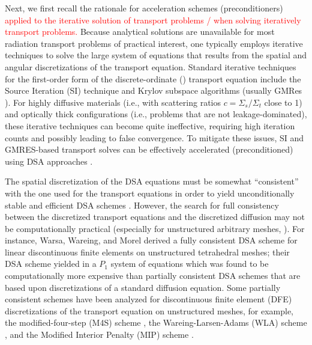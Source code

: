 
Next, we first recall the rationale for acceleration schemes (preconditioners) 
\textcolor{red}{applied to the iterative solution of
transport problems / when solving iteratively transport problems.}
Because analytical solutions are unavailable for most
radiation transport problems of practical interest, one typically employs
iterative techniques to solve the large system of equations that results from
the spatial and angular discretizations of the transport equation. Standard
iterative techniques for the first-order form of the discrete-ordinate (\sn)
transport equation include the Source Iteration (SI) technique and Krylov 
subspace algorithms (usually GMRes \cite{gmres}). For highly diffusive materials 
(i.e., with scattering ratios $c=\Sigma_s / \Sigma_t $ close to 1) and optically 
thick configurations (i.e., problems that are not leakage-dominated), these iterative techniques 
can become quite ineffective, requiring high iteration counts and possibly 
leading to false convergence. To mitigate these issues, SI and GMRES-based transport solves 
can be effectively accelerated (preconditioned) using DSA approaches 
\cite{dsa_ref,larsen_dsa,consistent_p1,m4s,wla,mip}. 

The spatial discretization of the DSA equations
must be somewhat ``consistent'' with the one used for the \sn transport equations 
in order to yield unconditionally stable and efficient DSA schemes
\cite{dsa_ref,larsen_dsa,consistent_p1,m4s,wla,mip}. However, the search for full
consistency between the discretized transport equations and the discretized
diffusion may not be computationally practical (especially for unstructured
arbitrary meshes, \cite{dsa_ref}). For instance, Warsa, Wareing, and
Morel \cite{consistent_p1} derived a fully consistent DSA scheme for linear
discontinuous finite elements on unstructured tetrahedral meshes; their DSA
scheme yielded in a $P_1$ system of equations which was found to be
computationally more expensive than partially consistent DSA schemes that are
based upon discretizations of a standard diffusion equation. Some partially 
consistent schemes have been analyzed for discontinuous finite element
(DFE) discretizations of the transport equation on unstructured meshes, for
example, the modified-four-step (M4S) scheme \cite{m4s}, the
Wareing-Larsen-Adams (WLA) scheme \cite{wla}, and the Modified Interior
Penalty (MIP) scheme \cite{mip}.

